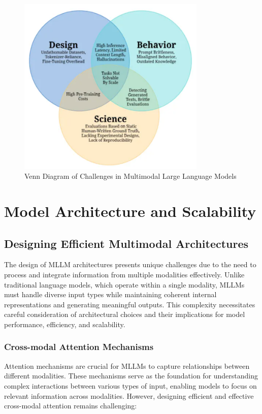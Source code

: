 \begin{figure}[h]
\centering
\includegraphics[width=0.8\textwidth]{mllm_challenges.png}
\caption{Venn Diagram of Challenges in Multimodal Large Language Models}
\label{fig:mllm_challenges}
\end{figure}

\section{Model Architecture and Scalability}

\subsection{Designing Efficient Multimodal Architectures}
The design of MLLM architectures presents unique challenges due to the need to process and integrate information from multiple modalities effectively. Unlike traditional language models, which operate within a single modality, MLLMs must handle diverse input types while maintaining coherent internal representations and generating meaningful outputs. This complexity necessitates careful consideration of architectural choices and their implications for model performance, efficiency, and scalability.


\subsubsection{Cross-modal Attention Mechanisms}
Attention mechanisms are crucial for MLLMs to capture relationships between different modalities. These mechanisms serve as the foundation for understanding complex interactions between various types of input, enabling models to focus on relevant information across modalities. However, designing efficient and effective cross-modal attention remains challenging:

